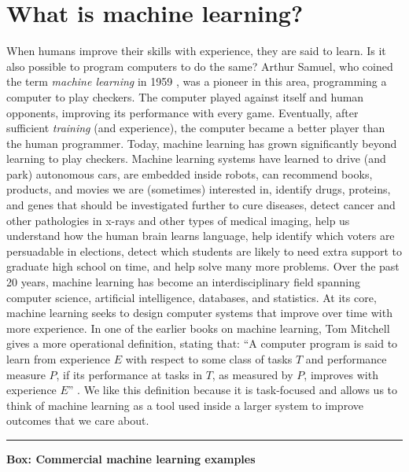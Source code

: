 \documentclass[]{krantz}
\begin{document}
\section{What is machine learning?}\label{what-is-machine-learning}

When humans improve their skills with experience, they are said to
learn. Is it also possible to program computers to do the same? Arthur
Samuel, who coined the term \emph{machine learning} in 1959
\citep{samuel1959some}, was a pioneer in this area, programming a
computer to play checkers. The computer played against itself and human
opponents, improving its performance with every game. Eventually, after
sufficient \emph{training} (and experience), the computer became a
better player than the human programmer. Today, machine learning has
grown significantly beyond learning to play checkers. Machine learning
systems have learned to drive (and park) autonomous cars, are embedded
inside robots, can recommend books, products, and movies we are
(sometimes) interested in, identify drugs, proteins, and genes that
should be investigated further to cure diseases, detect cancer and other
pathologies in x-rays and other types of medical imaging, help us
understand how the human brain learns language, help identify which
voters are persuadable in elections, detect which students are likely to
need extra support to graduate high school on time, and help solve many
more problems. Over the past 20 years, machine learning has become an
interdisciplinary field spanning computer science, artificial
intelligence, databases, and statistics. At its core, machine learning
seeks to design computer systems that improve over time with more
experience. In one of the earlier books on machine learning, Tom
Mitchell gives a more operational definition, stating that: ``A computer
program is said to learn from experience \(E\) with respect to some
class of tasks \(T\) and performance measure \(P\), if its performance
at tasks in \(T\), as measured by \(P\), improves with experience
\(E\)'' \citep{mitchell1997machine}. We like this definition because it
is task-focused and allows us to think of machine learning as a tool
used inside a larger system to improve outcomes that we care about.

\begin{center}\rule{0.5\linewidth}{\linethickness}\end{center}

\textbf{Box: Commercial machine learning examples}
\end{document}
